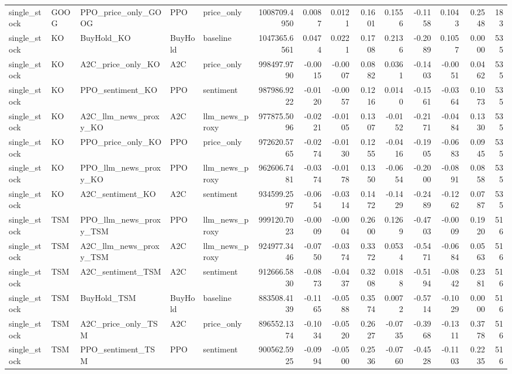 \begin{tabular}{lllllrrrrrrrrr}
single_stock & GOOG & PPO_price_only_GOOG & PPO & price_only & 1008709.4950 & 0.0087 & 0.0121 & 0.1601 & 0.1556 & -0.1158 & 0.1043 & 0.2548 & 183 \\
single_stock & KO & BuyHold_KO & BuyHold & baseline & 1047365.6561 & 0.0474 & 0.0221 & 0.1708 & 0.2136 & -0.2089 & 0.1057 & 0.0000 & 535 \\
single_stock & KO & A2C_price_only_KO & A2C & price_only & 998497.9790 & -0.0015 & -0.0007 & 0.0882 & 0.0361 & -0.1403 & -0.0051 & 0.0462 & 535 \\
single_stock & KO & PPO_sentiment_KO & PPO & sentiment & 987986.9222 & -0.0120 & -0.0057 & 0.1216 & 0.0140 & -0.1561 & -0.0364 & 0.1073 & 535 \\
single_stock & KO & A2C_llm_news_proxy_KO & A2C & llm_news_proxy & 977875.5096 & -0.0221 & -0.0105 & 0.1307 & -0.0152 & -0.2171 & -0.0484 & 0.1330 & 535 \\
single_stock & KO & PPO_price_only_KO & PPO & price_only & 972620.5765 & -0.0274 & -0.0130 & 0.1255 & -0.0416 & -0.1905 & -0.0683 & 0.0945 & 535 \\
single_stock & KO & PPO_llm_news_proxy_KO & PPO & llm_news_proxy & 962606.7481 & -0.0374 & -0.0178 & 0.1350 & -0.0654 & -0.2000 & -0.0891 & 0.0858 & 535 \\
single_stock & KO & A2C_sentiment_KO & A2C & sentiment & 934599.2597 & -0.0654 & -0.0314 & 0.1472 & -0.1429 & -0.2489 & -0.1262 & 0.0787 & 535 \\
single_stock & TSM & PPO_llm_news_proxy_TSM & PPO & llm_news_proxy & 999120.7023 & -0.0009 & -0.0004 & 0.2600 & 0.1269 & -0.4703 & -0.0009 & 0.1920 & 516 \\
single_stock & TSM & A2C_llm_news_proxy_TSM & A2C & llm_news_proxy & 924977.3446 & -0.0750 & -0.0374 & 0.3372 & 0.0534 & -0.5471 & -0.0684 & 0.0563 & 516 \\
single_stock & TSM & A2C_sentiment_TSM & A2C & sentiment & 912666.5830 & -0.0873 & -0.0437 & 0.3208 & 0.0188 & -0.5194 & -0.0842 & 0.2381 & 516 \\
single_stock & TSM & BuyHold_TSM & BuyHold & baseline & 883508.4139 & -0.1165 & -0.0588 & 0.3574 & 0.0072 & -0.5714 & -0.1029 & 0.0000 & 516 \\
single_stock & TSM & A2C_price_only_TSM & A2C & price_only & 896552.1374 & -0.1034 & -0.0520 & 0.2627 & -0.0735 & -0.3968 & -0.1311 & 0.3778 & 516 \\
single_stock & TSM & PPO_sentiment_TSM & PPO & sentiment & 900562.5925 & -0.0994 & -0.0500 & 0.2536 & -0.0760 & -0.4528 & -0.1103 & 0.2235 & 516 \\

\end{tabular}
